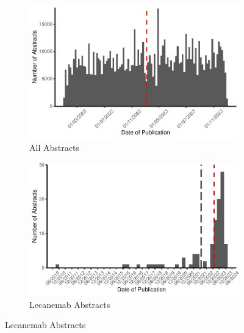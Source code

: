 \documentclass[
  a4paper,
]{article}
\begin{document}
\begin{figure}

\begin{minipage}[t]{0.50\linewidth}

{\centering 

\begin{figure}[H]

{\centering \includegraphics{report_pdf_files/figure-pdf/fig-publication-date-1.pdf}

}

\caption{All Abstracts}

\end{figure}

\begin{figure}[H]

{\centering \includegraphics{report_pdf_files/figure-pdf/fig-publication-date-2.pdf}

}

\caption{Lecanemab Abstracts}


\end{figure}}
\end{minipage}
\end{figure}
\end{document}
